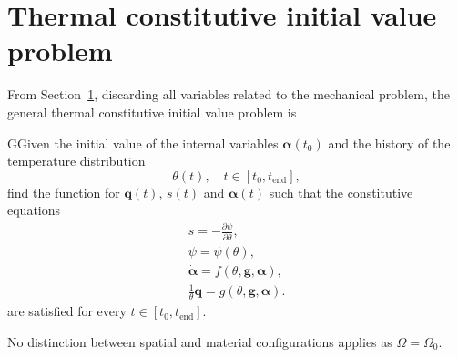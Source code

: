 \section{Thermal constitutive initial value problem}

From Section~\ref{}, discarding all variables related to the mechanical problem, the general thermal constitutive initial value problem is
\begin{problem}
GGiven the initial value of the internal variables \(\bm \alpha(t_0)\) and the history of the temperature distribution
\[\theta(t),\quad t\in[t_0, t_\text{end}],\]
find the function for $\bm q(t)$, \(s(t)\) and \(\bm \alpha(t)\) such that the constitutive equations
\begin{gather}
    s = -\frac{\partial \psi}{\partial \theta},\label{eq:entropy_constitutive_relation}\\
    \psi = \psi(\theta),\\
    \dot{\bm \alpha} = f(\theta, \bm g, \bm \alpha),\\
    \frac{1}{\theta}\bm q = g(\theta, \bm g, \bm \alpha).
\end{gather}
are satisfied for every $t\in [t_0, t_\text{end}]$.
\end{problem}
No distinction between spatial and material configurations applies as \(\Omega = \Omega_0\).

